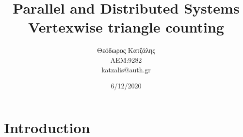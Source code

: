 \documentclass[12pt, a4paper]{article}
\title{\textbf{Parallel and Distributed Systems \\ Vertexwise triangle counting}}
\author{Θεόδωρος Κατζάλης \\ ΑΕΜ:9282 \\ katzalis@auth.gr}
\date{6/12/2020}
\begin{document}
\sloppy
%
\maketitle



\vspace{0.1cm}
\section{Introduction}
\vspace{0.2cm}

\end{document}
